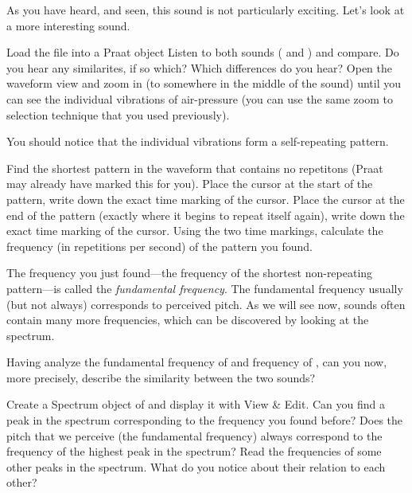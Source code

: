 \documentclass[a4paper, 9pt]{article}
\begin{document}
As you have heard, and seen, this sound is not particularly exciting.
Let's look at a more interesting sound.

\begin{exercise}
\action Load the file  into a Praat object 
\action Listen to both sounds ( and ) and compare. Do you hear any similarites, if so which? Which differences do you hear?
\action Open the waveform view and zoom in (to somewhere in the middle of the sound) until you can see the individual vibrations of air-pressure (you can use the same zoom to selection technique that you used previously).
\end{exercise}

\newpage
\noindent You should notice that the individual vibrations form a self-repeating
pattern.

\begin{exercise}
\action Find the shortest pattern in the waveform that contains no repetitons (Praat may already have marked this for you).
\action Place the cursor at the start of the pattern, write down the exact time marking of the cursor. 
\action Place the cursor at the end of the pattern (exactly where it begins to repeat itself again), write down the exact time marking of the cursor. 
\ask Using the two time markings, calculate the frequency (in repetitions per second) of the pattern you found. 
\end{exercise}

The frequency you just found---the frequency of the shortest
non-repeating pattern---is called the \emph{fundamental frequency}. The
fundamental frequency usually (but not always) corresponds to perceived
pitch. As we will see now, sounds often contain many more frequencies,
which can be discovered by looking at the spectrum.

\begin{exercise}
\ask Having analyze the fundamental frequency of  and frequency of , can you now, more precisely, describe the similarity between the two sounds?
\end{exercise}

\begin{exercise}
\action Create a Spectrum object of  and display it with View \& Edit. 
\action Can you find a peak in the spectrum corresponding to the frequency you found before?  
\askstar Does the pitch that we perceive (the fundamental frequency) always correspond to the frequency of the highest peak in the spectrum? 
\action Read the frequencies of some other peaks in the spectrum. What do you notice about their relation to each other?
\end{exercise}
\end{document}
